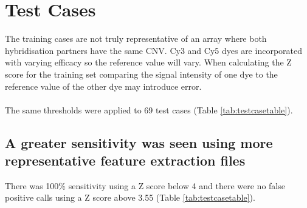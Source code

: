 \section{Test Cases}
The training cases are not truly representative of an array where both hybridisation partners have the same CNV. Cy3 and Cy5 dyes are incorporated with varying efficacy so the reference value will vary. When calculating the Z score for the training set comparing the signal intensity of one dye to the reference value of the other dye may introduce error.
\paragraph*{}
The same thresholds were applied to 69 test cases (Table \ref{tab:testcasetable}). 



\subsection{A greater sensitivity was seen using more representative feature extraction files}
There was 100\% sensitivity using a Z score below 4 and there were no false positive calls using a Z score above 3.55 (Table \ref{tab:testcasetable}). 


\begin{table}[h]
\centering
\caption[Test cases: Calls made at a range of thresholds]{Test cases: A call was made in the expected CNV region in all cases with a threshold below 4. There were no false positive calls made with a threshold above 3.55}
\label{tab:testcasetable}
\end{table}

